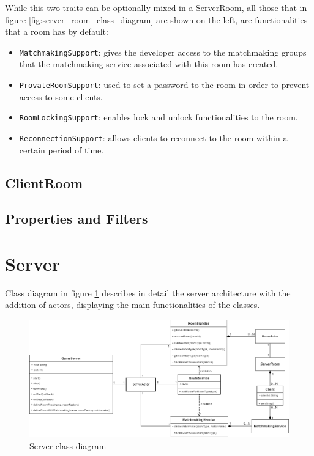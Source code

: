 While this two traits can be optionally mixed in a ServerRoom, all those that in figure \ref{fig:server_room_class_diagram} are shown on the left, are functionalities that a room has by default:
\begin{itemize}
	\item \texttt{MatchmakingSupport}: gives the developer access to the matchmaking groups that the matchmaking service associated with this room has created.
	\item \texttt{ProvateRoomSupport}: used to set a password to the room in order to prevent access to some clients.
	\item \texttt{RoomLockingSupport}: enables lock and unlock functionalities to the room. 
	\item \texttt{ReconnectionSupport}: allows clients to reconnect to the room within a certain period of time.
\end{itemize}

\subsection{ClientRoom}

\subsection{Properties and Filters}

\section{Server}
Class diagram in figure \ref{fig:server_class_diagram} describes in detail the server architecture with the addition of actors, displaying the main functionalities of the classes.
\begin{figure}[h]
	\hspace*{-1.1in}
	\includegraphics[scale=0.55]{images/4-design/server_class.png}
	\caption{Server class diagram}
	\label{fig:server_class_diagram}
\end{figure}


